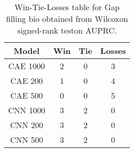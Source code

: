 \begin{table}[H]
\centering
\begin{tabular}{|c|c|c|c|}

\textbf{Model} &  \textbf{Win} &  \textbf{Tie} &  \textbf{Losses} \\
\hline

      CAE 1000 &             2 &             0 &                3 \\
\hline
       CAE 200 &             1 &             0 &                4 \\
\hline
       CAE 500 &             0 &             0 &                5 \\
\hline
      CNN 1000 &             3 &             2 &                0 \\
\hline
       CNN 200 &             3 &             2 &                0 \\
\hline
       CNN 500 &             3 &             2 &                0 \\
\hline

\end{tabular}
\caption{Win-Tie-Losses table for Gap filling bio obtained from Wilcoxon signed-rank teston AUPRC.}
\label{tab:gap_filling_bio_model_comparison}
\end{table}